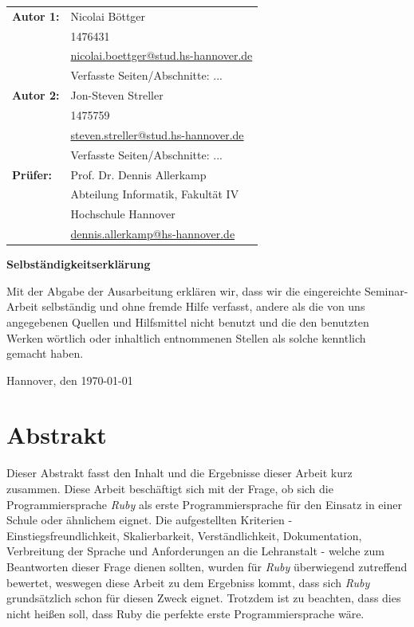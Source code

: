 \documentclass[12pt,DIV=14, version=first, BCOR=10mm,a4paper,twoside,parskip=half-,headsepline,headinclude]{scrartcl}
\begin{document}
  \newpage \thispagestyle{empty}
 \begin{tabular}{ll}
{\bfseries\sffamily Autor 1:} &  Nicolai Böttger \\
            & 1476431 \\
            & \href{mailto:nicolai.boettger@stud.hs-hannover.de}{nicolai.boettger@stud.hs-hannover.de} \\
            & Verfasste Seiten/Abschnitte: ...
            \\[5ex]
{\bfseries\sffamily Autor 2:} & Jon-Steven Streller \\
            & 1475759 \\
            & \href{mailto:steven.streller@stud.hs-hannover.de}{steven.streller@stud.hs-hannover.de} \\
           & Verfasste Seiten/Abschnitte: ... \\[5ex]
 {\bfseries\sffamily Prüfer:} &Prof. Dr. Dennis Allerkamp \\
          & Abteilung Informatik, Fakultät IV \\
         & Hochschule Hannover \\
        & \href{mailto:dennis.allerkamp@hs-hannover.de}{dennis.allerkamp@hs-hannover.de}
\end{tabular}

\vfill

\begin{center} \sffamily\bfseries Selbständigkeitserklärung \end{center}

Mit der Abgabe der Ausarbeitung erklären wir, dass wir die eingereichte Seminar-Arbeit
selbständig und ohne fremde Hilfe verfasst, andere als die von uns angegebenen Quellen
und Hilfsmittel nicht benutzt und die den benutzten Werken wörtlich oder
inhaltlich entnommenen Stellen als solche kenntlich gemacht haben.
\vspace*{7ex}

Hannover, den \today \hfill

\pagebreak
\section{Abstrakt}
\begin{flushleft}
Dieser Abstrakt fasst den Inhalt und die Ergebnisse dieser Arbeit kurz zusammen. Diese Arbeit beschäftigt sich mit der Frage, ob sich die Programmiersprache \textit{\glqq Ruby\grqq} als erste Programmiersprache für den Einsatz in einer Schule oder ähnlichem eignet. Die aufgestellten Kriterien - Einstiegsfreundlichkeit, Skalierbarkeit, Verständlichkeit, Dokumentation, Verbreitung der Sprache und Anforderungen an die Lehranstalt - welche zum Beantworten dieser Frage dienen sollten, wurden für \textit{\glqq Ruby\grqq} überwiegend zutreffend bewertet, weswegen diese Arbeit zu dem Ergebniss kommt, dass sich \textit{\glqq Ruby\grqq} grundsätzlich schon für diesen Zweck eignet. Trotzdem ist zu beachten, dass dies nicht heißen soll, dass Ruby die perfekte erste Programmiersprache wäre.
\end{flushleft}
\end{document}
